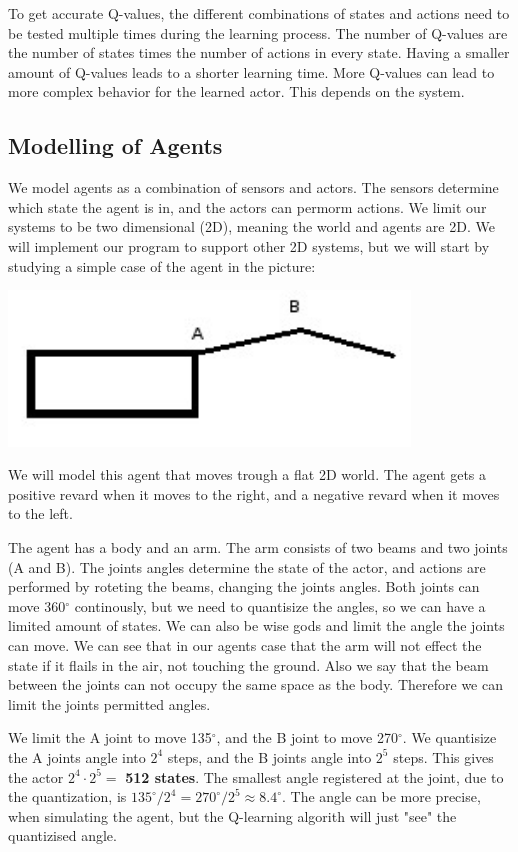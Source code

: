 \documentclass{article}
\begin{document}
To get accurate Q-values, the different combinations of states and actions
need to be tested multiple times during the learning process.
The number of Q-values are the number of states times the number of actions
in every state. Having a smaller amount of Q-values leads to a shorter learning
time. More Q-values can lead to more complex behavior for the learned actor.
This depends on the system.


\subsection{Modelling of Agents}
We model agents as a combination of sensors and actors. The sensors determine
which state the agent is in, and the actors can permorm actions.
We limit our systems to be two dimensional (2D), meaning the world and agents
are 2D. We will implement our program to support other 2D systems, but we
will start by studying a simple case of the agent in the picture:

\includegraphics[width=0.8\textwidth]{simple_agent}

We will model this agent that moves trough a flat 2D world.
The agent gets a positive revard when it moves to the right, and a negative
revard when it moves to the left.

The agent has a body and an arm. The arm consists of two beams and two joints
(A and B). The joints angles determine the state of the actor, and actions are
performed by roteting the beams, changing the joints angles.
Both joints can move 360$^\circ$ continously, but we need to quantisize
the angles, so we can have a limited amount of states. We can also be wise
gods and limit the angle the joints can move. We can see that in our agents
case that the arm will not effect the state if it flails in the air, not
touching the ground. Also we say that the beam between the joints can not
occupy the same space as the body. Therefore we can limit the joints
permitted angles.

We limit the A joint to move 135$^\circ$, and the B joint to move
270$^\circ$. We quantisize the A joints angle into $2^4$ steps, and
the B joints angle into $2^5$ steps. This gives the actor
$2^4 \cdot 2^5 =$ \textbf{512 states}. The smallest angle registered at
the joint, due to the quantization, is
$135^\circ / 2^4 = 270^\circ / 2^5 \approx 8.4^\circ$.
The angle can be more precise, when simulating the agent, but the
Q-learning algorith will just "see" the quantizised angle.
\end{document}
